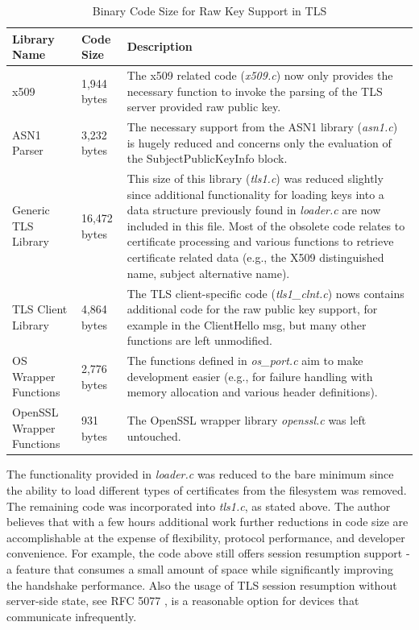 \documentclass[a4paper, 10pt]{IEEEtran}
\begin{document}
\begin{table}[htdp]
\caption{Binary Code Size for Raw Key Support in TLS}
\begin{center}
\begin{tabular}{|p{1cm}|p{}|p{}|}
\hline
\textbf{Library Name} & \textbf{Code Size} & \textbf{Description} \\
\hline\hline
x509& 1,944 bytes & The x509 related code (\textit{x509.c}) now only provides the necessary function to invoke the parsing of the TLS server provided raw public key.\\ 
\hline\hline
ASN1 Parser & 3,232 bytes & The necessary support from the ASN1 library (\textit{asn1.c}) is hugely reduced and concerns only the evaluation of the SubjectPublicKeyInfo block.\\ 
\hline\hline
Generic TLS Library & 16,472 bytes & This size of this library (\textit{tls1.c}) was reduced slightly since additional functionality for loading keys into a data structure previously found in \textit{loader.c} are now included in this file. Most of the obsolete code relates to certificate processing and various functions to retrieve certificate related data (e.g., the X509 distinguished name, subject alternative name).\\ 
\hline\hline
TLS Client Library & 4,864 bytes & The TLS client-specific code (\textit{tls1\_clnt.c}) nows contains additional code for the raw public key support, for example in the ClientHello msg, but many other functions are left unmodified. \\ 
\hline\hline
OS Wrapper Functions & 2,776 bytes & The functions defined in \textit{os\_port.c} aim to make development easier (e.g., for failure handling with memory allocation and various header definitions).\\ 
\hline\hline
OpenSSL Wrapper Functions & 931 bytes & The OpenSSL wrapper library \textit{openssl.c} was left untouched. \\ 
\hline
\end{tabular}
\end{center}
\label{tls-raw-code-table}
\end{table}

The functionality provided in \textit{loader.c} was reduced to the bare minimum since the ability to load different types of certificates from the filesystem was removed. The remaining code was incorporated into \textit{tls1.c}, as stated above. The author believes that with a few hours additional work further reductions in code size are accomplishable at the expense of flexibility, protocol performance, and developer convenience. For example, the code above still offers session resumption support - a feature that consumes a small amount of space while significantly improving the handshake performance. Also the usage of TLS session resumption without server-side state, see RFC 5077 \cite{rfc5077}, is a reasonable option for devices that communicate infrequently. 
\end{document}
